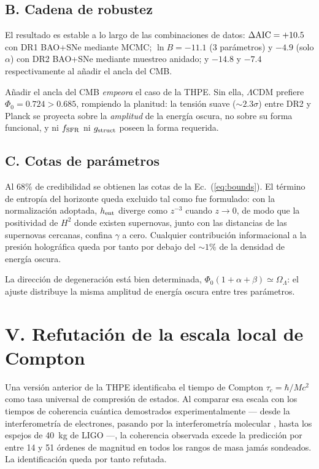 \documentclass[aps,prd,twocolumn,superscriptaddress,nofootinbib,floatfix]{revtex4-2}
\newcommand{\LCDM}{\ensuremath{\Lambda}CDM}
\begin{document}
\subsection*{B. Cadena de robustez}

El resultado es estable a lo largo de las combinaciones de datos:
$\Delta{\rm AIC}=+10.5$ con DR1 BAO+SNe mediante MCMC; $\ln B=-11.1$
(3 par\'ametros) y $-4.9$ (solo $\alpha$) con DR2 BAO+SNe mediante
muestreo anidado; y $-14.8$ y $-7.4$ respectivamente al a\~nadir el
ancla del CMB.

A\~nadir el ancla del CMB \emph{empeora} el caso de la THPE. Sin ella,
\LCDM{} prefiere $\Phi_0=0.724>0.685$, rompiendo la planitud: la
tensi\'on suave ($\sim2.3\sigma$) entre DR2 y Planck se proyecta sobre
la \emph{amplitud} de la energ\'ia oscura, no sobre su forma funcional,
y ni $f_{\rm SFR}$ ni $g_{\rm struct}$ poseen la forma requerida.

\subsection*{C. Cotas de par\'ametros}

Al 68\% de credibilidad se obtienen las cotas de la
Ec.~(\ref{eq:bounds}). El t\'ermino de entrop\'ia del horizonte queda
excluido tal como fue formulado: con la normalizaci\'on adoptada,
$h_{\rm ent}$ diverge como $z^{-3}$ cuando $z\to0$, de modo que la
positividad de $H^2$ donde existen supernovas, junto con las distancias
de las supernovas cercanas, confina $\gamma$ a cero. Cualquier
contribuci\'on informacional a la presi\'on hologr\'afica queda por
tanto por debajo del $\sim1\%$ de la densidad de energ\'ia oscura.

La direcci\'on de degeneraci\'on est\'a bien determinada,
$\Phi_0(1+\alpha+\beta)\simeq\Omega_\Lambda$: el ajuste distribuye la
misma amplitud de energ\'ia oscura entre tres par\'ametros.

\section*{V. Refutaci\'on de la escala local de Compton}

Una versi\'on anterior de la THPE identificaba el tiempo de Compton
$\tau_c=\hbar/Mc^2$ como tasa universal de compresi\'on de estados. Al
comparar esa escala con los tiempos de coherencia cu\'antica
demostrados experimentalmente --- desde la interferometr\'ia de
electrones, pasando por la interferometr\'ia molecular \cite{Fein2019},
hasta los espejos de 40~kg de LIGO ---, la coherencia observada excede
la predicci\'on por entre 14 y 51 \'ordenes de magnitud en todos los
rangos de masa jam\'as sondeados. La identificaci\'on queda por tanto
refutada.
\end{document}
